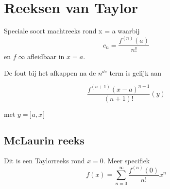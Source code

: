 		\section{Reeksen van Taylor}
		Speciale soort machtreeks rond x = a waarbij
	$$c_n = \frac{f^{(n)}(a)}{n!}$$
	en $f\;\infty$ afleidbaar in $x = a$.

	De fout bij het afkappen na de $n^{de}$ term is gelijk aan

	$$\frac{f^{(n + 1)}(x - a)^{n + 1}}{(n + 1)!} (y)$$

	met $y = ]a, x[$
	\subsection{McLaurin reeks}
	Dit is een Taylorreeks rond $x = 0$. Meer specifiek
	$$f(x) = \sum_{n = 0}^{\infty} \frac{f^{(n)}(0)}{n!}x^n$$


